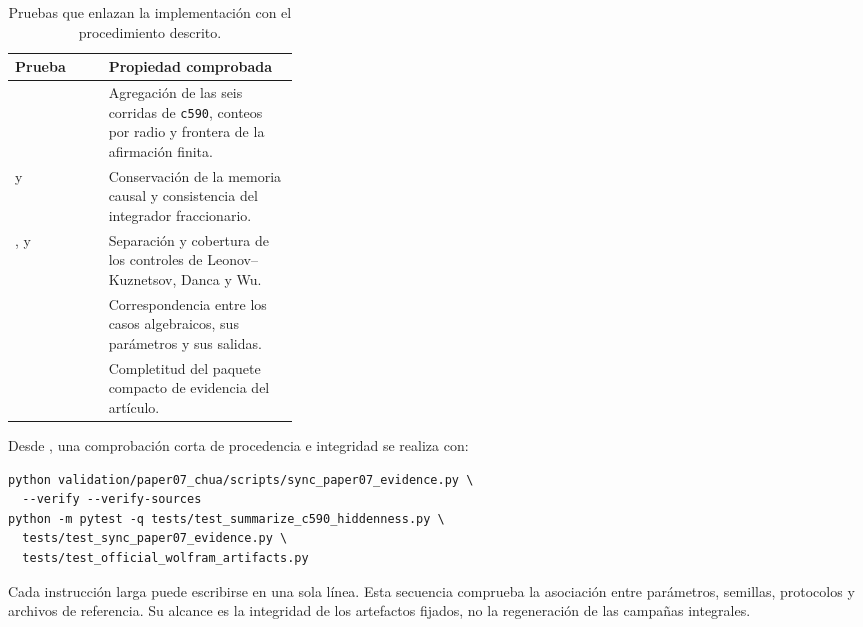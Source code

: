 \begin{table}[H]
\centering
\caption{Pruebas que enlazan la implementación con el procedimiento descrito.}
\label{tab:pruebas_trazabilidad}
\begin{tabularx}{\linewidth}{L{0.33\linewidth}Y}
\toprule
Prueba & Propiedad comprobada\\
\midrule
{}
& Agregación de las seis corridas de \texttt{c590}, conteos por radio y frontera
de la afirmación finita.\\
 y
& Conservación de la memoria causal y consistencia del integrador
fraccionario.\\
,
 y
& Separación y cobertura de los controles de Leonov--Kuznetsov, Danca y Wu.\\
& Correspondencia entre los casos algebraicos, sus parámetros y sus salidas.\\
& Completitud del paquete compacto de evidencia del artículo.\\
\bottomrule
\end{tabularx}
\end{table}

Desde , una comprobación corta de procedencia e integridad
se realiza con:
\begin{verbatim}
python validation/paper07_chua/scripts/sync_paper07_evidence.py \
  --verify --verify-sources
python -m pytest -q tests/test_summarize_c590_hiddenness.py \
  tests/test_sync_paper07_evidence.py \
  tests/test_official_wolfram_artifacts.py
\end{verbatim}
Cada instrucción larga puede escribirse en una sola línea. Esta secuencia
comprueba la asociación entre parámetros, semillas, protocolos y archivos de
referencia. Su alcance es la integridad de los artefactos fijados, no la
regeneración de las campañas integrales.
